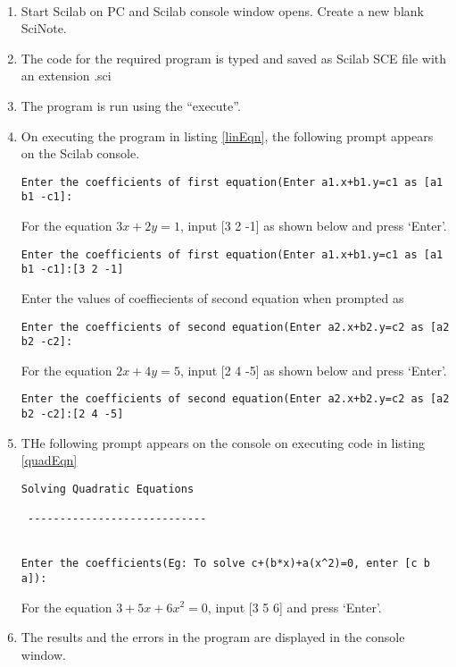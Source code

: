 \paragraph{}
\begin{enumerate}
\item
Start Scilab on PC and Scilab console window opens. Create a new blank SciNote.
\item
The code for the required program is typed and saved as Scilab SCE file with an extension .sci
\item
The program is run using the “execute”.
\item
On executing the program in listing \ref{linEqn}, the following prompt appears on the Scilab console.

\begin{lstlisting}[numbers=none]
Enter the coefficients of first equation(Enter a1.x+b1.y=c1 as [a1 b1 -c1]:
\end{lstlisting}

For the equation $3x+2y=1$, input [3 2 -1] as shown below and press  `Enter'.
\begin{lstlisting}[numbers=none]
Enter the coefficients of first equation(Enter a1.x+b1.y=c1 as [a1 b1 -c1]:[3 2 -1] 
\end{lstlisting}
Enter the values of coeffiecients of second equation when prompted as
\begin{lstlisting}[numbers=none]
Enter the coefficients of second equation(Enter a2.x+b2.y=c2 as [a2 b2 -c2]:
\end{lstlisting}
For the equation $2x+4y=5$, input [2 4 -5] as shown below and press  `Enter'.
\begin{lstlisting}[numbers=none]
Enter the coefficients of second equation(Enter a2.x+b2.y=c2 as [a2 b2 -c2]:[2 4 -5]
\end{lstlisting}
\item
THe following prompt appears on the console on executing code in listing \ref{quadEqn}
\begin{lstlisting}[numbers=none]
Solving Quadratic Equations   
 
 ----------------------------   
 
     
Enter the coefficients(Eg: To solve c+(b*x)+a(x^2)=0, enter [c b a]):
\end{lstlisting}

For the equation $3+5x+6x^2=0$, input [3 5 6] and press `Enter'.
\item

The results and the errors in the program are displayed in the console window.
\end{enumerate}

